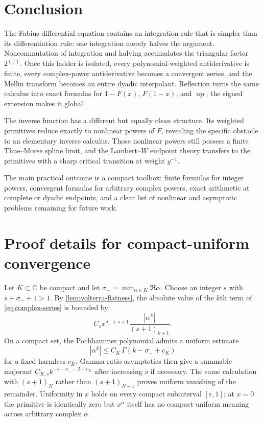 \documentclass[11pt,oneside]{article}
\numberwithin{equation}{section}
\theoremstyle{definition}
\theoremstyle{remark}
\newcommand{\C}{\mathbb C}
\newcommand{\Up}{\operatorname{up}}
\newcommand{\fall}[2]{#1^{\underline{#2}}}
\newcommand{\abs}[1]{\left|#1\right|}
\begin{document}
\section{Conclusion}
\label{sec:conclusion}

The Fabius differential equation contains an integration rule that is simpler
than its differentiation rule: one integration merely halves the argument.
Noncommutation of integration and halving accumulates the triangular factor
$2^{\binom n2}$.  Once this ladder is isolated, every polynomial-weighted
antiderivative is finite, every complex-power antiderivative becomes a
convergent series, and the Mellin transform becomes an entire dyadic
interpolant.  Reflection turns the same calculus into exact formulas for
$1-F(x)$, $F(1-x)$, and $\Up$; the signed extension makes it global.

The inverse function has a different but equally clean structure.  Its
weighted primitives reduce exactly to nonlinear powers of $F$, revealing the
specific obstacle to an elementary inverse calculus.  Those nonlinear powers
still possess a finite Thue--Morse spline limit, and the Lambert--$W$ endpoint
theory transfers to the primitives with a sharp critical transition at weight
$y^{-1}$.

The main practical outcome is a compact toolbox: finite formulas for integer
powers, convergent formulas for arbitrary complex powers, exact arithmetic at
complete or dyadic endpoints, and a clear list of nonlinear and asymptotic
problems remaining for future work.

\appendix
\section{Proof details for compact-uniform convergence}
\label{app:uniform}

Let $K\subset\C$ be compact and let
$\sigma_- =\min_{\alpha\in K}\Re\alpha$.  Choose an integer $s$ with
$s+\sigma_-+1>1$.  By \cref{lem:volterra-flatness}, the absolute value of the
$k$th term of \eqref{eq:complex-series} is bounded by
\begin{equation}
 C_s x^{\sigma_-+s+1}
 \frac{\abs{\fall{\alpha}{k}}}{(s+1)_{k+1}}.              \label{eq:uniform-term-bound}
\end{equation}
On a compact set, the Pochhammer polynomial admits a uniform estimate
\begin{equation}
 \abs{\fall{\alpha}{k}}\le C_K\,\Gamma(k-\sigma_-+c_K)   \label{eq:pochhammer-uniform}
\end{equation}
for a fixed harmless $c_K$.  Gamma-ratio asymptotics then give a summable
majorant $C_{K,s}k^{-s-\sigma_- -2+c_K}$ after increasing $s$ if necessary.
The same calculation with $(s+1)_N$ rather than $(s+1)_{N+1}$ proves uniform
vanishing of the remainder.  Uniformity in $x$ holds on every compact
subinterval $[\varepsilon,1]$; at $x=0$ the primitive is identically zero but
$x^\alpha$ itself has no compact-uniform meaning across arbitrary complex
$\alpha$.
\end{document}
